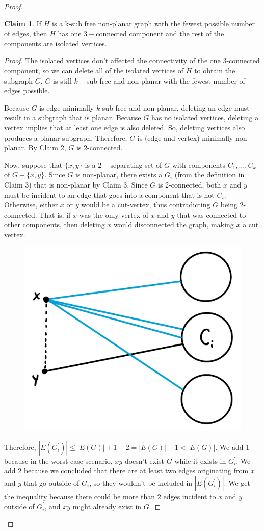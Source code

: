\documentclass[12pt]{article}
\theoremstyle{definition}
\newtheorem{claim}{Claim}
\begin{document}
\begin{proof}
\begin{greenbox}
    \begin{claim}
        If $H$ is a k-sub free non-planar graph with the fewest possible number of edges, then $H$ has one $3-$connected component and the rest of the components are isolated vertices.
    \end{claim}
\end{greenbox}

\begin{proof}
    The isolated vertices don't affected the connectivity of the one $3$-connected component, so we can delete all of the isolated vertices of $H$ to obtain the subgraph $G$. $G$ is still $k-$sub free and non-planar with the fewest number of edges possible.

    Because $G$ is edge-minimally $k$-sub free and non-planar, deleting an edge must result in a subgraph that is planar. Because $G$ has no isolated vertices, deleting a vertex implies that at least one edge is also deleted. So, deleting vertices also produces a planar subgraph. Therefore, $G$ is (edge and vertex)-minimally non-planar. By Claim 2, $G$ is 2-connected.

    Now, suppose that $\{x,y\}$ is a $2-$separating set of $G$ with components $C_1, \ldots, C_k$ of $G - \{x,y\}$. Since $G$ is non-planar, there exists a $G_i^{\prime}$ (from the definition in Claim 3) that is non-planar by Claim 3. Since $G$ is 2-connected, both $x$ and $y$ must be incident to an edge that goes into a component that is not $C_i$. Otherwise, either $x$ or $y$ would be a cut-vertex, thus contradicting $G$ being 2-connected. That is, if $x$ was the only vertex of $x$ and $y$ that was connected to other components, then deleting $x$ would disconnected the graph, making $x$ a cut vertex.

    \begin{figure}[hbt!]
        \centering
        \includegraphics[width=0.35\linewidth]{graphs/c_i_xy.png}
        \caption{}
    \end{figure}
    \noindent Therefore, $|E(G_i^{\prime})| \leq |E(G)| + 1 - 2 = |E(G)| - 1 < |E(G)|$. We add 1 because in the worst case scenario, $xy$ doesn't exist $G$ while it exists in $G_i^{\prime}$. We add 2 because we concluded that there are at least two edges originating from $x$ and $y$ that go outside of $G_i^{\prime}$, so they wouldn't be included in $|E(G_i^{\prime})|$. We get the inequality because there could be more than $2$ edges incident to $x$ and $y$ outside of $G_i^{\prime}$, and $xy$ might already exist in $G$.


\end{proof}
\end{proof}
\end{document}
